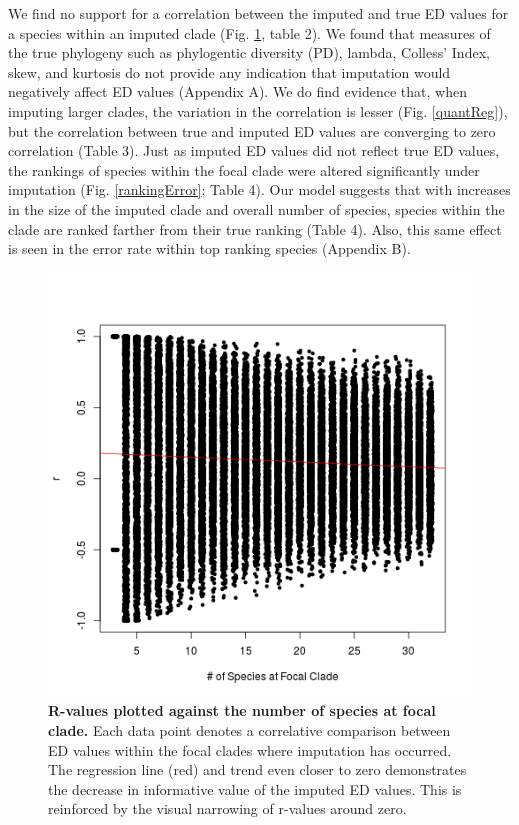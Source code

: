 \documentclass[12pt,english]{article}
\begin{document}
We find no support for a correlation between the imputed and true ED values for
a species within an imputed clade (Fig. \ref{imputationTrend}, table 2). We found
that measures of the true phylogeny such as phylogentic diversity (PD), lambda,
Colless' Index, skew, and kurtosis do not provide any indication that imputation
would negatively affect ED values (Appendix A). We do find evidence that, when
imputing larger clades, the variation in the correlation is lesser
(Fig. \ref{quantReg}), but the correlation between true and imputed ED values are
converging to zero correlation (Table 3). Just as imputed ED values did not reflect true ED
values, the rankings of species within the focal clade were altered
significantly under imputation (Fig. \ref{rankingError}; Table 4). Our model
suggests that with increases in the size of the imputed clade and overall number
of species, species within the clade are ranked farther from their true ranking
(Table 4). Also, this same effect is seen in the error rate within top ranking
species (Appendix B).

\begin{figure}[!ht]
  \center
  \includegraphics[width=.5\textwidth]{edModel.png}
  \caption{\textbf{R-values plotted against the number of species at focal
  clade.} Each data point denotes a correlative comparison between ED values
  within the focal clades where imputation has occurred. The regression line
  (red) and trend even closer to zero demonstrates the decrease in informative
  value of the imputed ED values. This is reinforced by the visual narrowing of
  r-values around zero.}
  \label{imputationTrend}
\end{figure}
\end{document}
